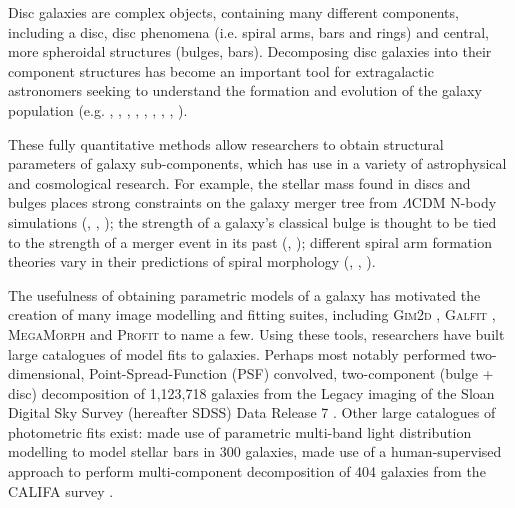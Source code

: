 \documentclass[../main.tex]{subfiles}
\begin{document}
\label{sec:introduction}

Disc galaxies are complex objects, containing many different components, including a disc, disc phenomena (i.e. spiral arms, bars and rings) and central, more spheroidal structures (bulges, bars). Decomposing disc galaxies into their component structures has become an important tool for extragalactic astronomers seeking to understand the formation and evolution of the galaxy population (e.g. \citealt{Simard2002:astro-ph/0205025v2}, \citealt{2011ApJS..196...11S}, \citealt{2012MNRAS.421.2277L}, \citealt{2017MNRAS.469.3363K}, \citealt{megamorph-paper}, \citealt{2011MNRAS.415.3308G}, \citealt{Mendez-Abreu2016:1610.05324v1}, \citealt{Park2006:astro-ph/0611610v2}, \citealt{2015ApJS..219....4S}).

These fully quantitative methods allow researchers to obtain structural parameters of galaxy sub-components, which has use in a variety of astrophysical and cosmological research. For example, the stellar mass found in discs and bulges places strong constraints on the galaxy merger tree from $\Lambda\mathrm{CDM}$ N-body simulations (\citealt{Hopkins2010:1004.2708v3}, \citealt{2018MNRAS.475.5133R}, \citealt{2009MNRAS.396.1972P}); the strength of a galaxy's classical bulge is thought to be tied to the strength of a merger event in its past (\citealt{Kormendy2010:1009.3015v1}, \citealt{2005ApJ...622L...9S}); different spiral arm formation theories vary in their predictions of spiral morphology (\citealt{Dobbs2014:1407.5062v1}, \citealt{Pour-Imani2016:1608.00969v1}, \citealt{2017MNRAS.472.2263H}).

The usefulness of obtaining parametric models of a galaxy has motivated the creation of many image modelling and fitting suites, including \textsc{Gim2d} \citep{gim2d-paper}, \textsc{Galfit} \citep{galfit-paper}, \textsc{MegaMorph} \citep{megamorph-paper} and \textsc{Profit} \citep{profit-paper} to name a few. Using these tools, researchers have built large catalogues of model fits to galaxies. Perhaps most notably \citet{2011ApJS..196...11S} performed two-dimensional, Point-Spread-Function (PSF) convolved, two-component (bulge + disc) decomposition of 1,123,718 galaxies from the Legacy imaging of the Sloan Digital Sky Survey (hereafter SDSS) Data Release 7 \citep{SDSSDR7}. Other large catalogues of photometric fits exist: \cite{2011MNRAS.415.3308G} made use of parametric multi-band light distribution modelling to model stellar bars in 300 galaxies, \cite{Mendez-Abreu2016:1610.05324v1} made use of a human-supervised approach to perform multi-component decomposition of 404 galaxies from the CALIFA survey \citep{Sanchez2011:1111.0962v2}.
\end{document}
